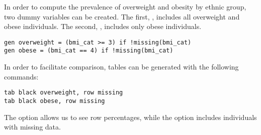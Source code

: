 \documentclass[paper=a4, DIV=12, fontsize=12pt, parskip=full]{scrartcl}
\begin{document}

In order to compute the prevalence of overweight and obesity by ethnic group, two dummy variables can be created. The first, , includes all overweight and obese individuals. The second, , includes only obese individuals.

\begin{verbatim}
gen overweight = (bmi_cat >= 3) if !missing(bmi_cat)
gen obese = (bmi_cat == 4) if !missing(bmi_cat)
\end{verbatim}

In order to facilitate comparison, tables can be generated with the following commands: 

\begin{verbatim}
tab black overweight, row missing
tab black obese, row missing
\end{verbatim}

The option  allows us to see row percentages, while the option  includes individuals with missing data.

\newpage
\end{document}
